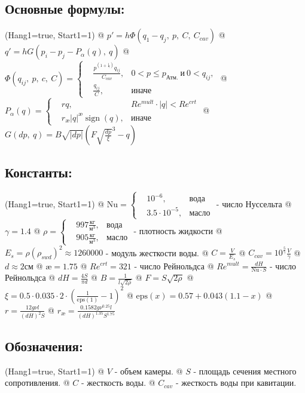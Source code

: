 \documentclass[12pt, a4paper]{article}
\DeclareMathOperator{\sign}{sign}
\begin{document}
\subsection{Основные формулы:}

\noindent\begin{easylist}
\ListProperties(Hang1=true, Start1=1)
@ $ p' = h \Phi(q_1 - q_j,\ p,\ C,\ C_{cav}) $
@ $ q' = h G(p_i-p_j-P_\alpha(q),\ q) $
@ $
\Phi(q_{ij},\ p,\ c,\ C) = \left\{
\begin{aligned}
&\frac{p^{\left(1+\frac{1}{\gamma}\right)}q_{ij}}{C_{cav}},  & 0 < p \leqslant p_{\text{Атм.}}\ \text{и} \ 0 < q_{ij}, \\
& \frac{q_{ij}}{C}, & \text{иначе}
\end{aligned}
\right.
$
@ $
P_\alpha(q) = \left\{
\begin{aligned}
&rq,  &Re^{mult} \cdot |q| < Re^{crt} \\
&r_\text{\ae}|q|^\text{\ae}\sign(q), & \text{иначе}
\end{aligned}
\right.
$
@ $ G(dp,\ q) = B\sqrt{|dp|}\left(F\sqrt{\frac{dp}{\xi}}^3 - q\right) $
\end{easylist}


\subsection{Константы:}

\noindent\begin{easylist}
\ListProperties(Hang1=true, Start1=1)
@ $ \mathrm{Nu} = \left\{
\begin{aligned}
& 10^{-6},  &\text{вода} \\
& 3.5 \cdot 10^{-5}, &\text{масло}
\end{aligned}
\right. $ - число Нуссельта
@ $ \gamma = 1.4 $
@ $ \rho = \left\{
\begin{aligned}
& 997 \frac{\text{кг}}{\text{м}^3},  &\text{вода} \\
& 905 \frac{\text{кг}}{\text{м}^3}, &\text{масло}
\end{aligned}
\right. $ - плотность жидкости
@ $ E_s = \rho (\rho_{swd})^2 \approx 1260000 $ - модуль жесткости воды.
@ $ C = \frac{V}{E_s} $
@ $ C_{cav} = 10^{\frac5\gamma}\frac{V}{\gamma} $
@ $ d \approx 2 \text{см} $
@ $ \text{\ae} = 1.75 $
@ $ Re^{crt} = 321 $ - число Рейнольдса
@ $ Re^{mult} = \frac{dH}{\mathrm{Nu} \cdot S} $ - число Рейнольдса
@ $ dH = \frac{4S}{\pi d} $
@ $ B = \frac{1}{l\sqrt{2\rho}} $
@ $ F = S\sqrt{2\rho} $
@ $ \xi = 0.5 \cdot 0.035 \cdot 2 \cdot \left(\frac{1}{\mathrm{eps}(1)} - 1\right)^2 $
@ $ \mathrm{eps}(x) = 0.57 + 0.043(1.1 - x) $
@ $ r = \frac{12g\nu l}{(dH)^2 S} $
@ $ r_\text{\ae} = \frac{0.1582 g \nu^{0.25} l}{(dH)^{1.35} S^{1.75}} $
\end{easylist}


\subsection{Обозначения:}

\noindent\begin{easylist}
\ListProperties(Hang1=true, Start1=1)
@ $ V $ - объем камеры. 
@ $ S $ - площадь сечения местного сопротивления.
@ $ C $ - жесткость воды.
@ $ C_{cav} $ - жесткость воды при кавитации.
\end{easylist}
\end{document}
